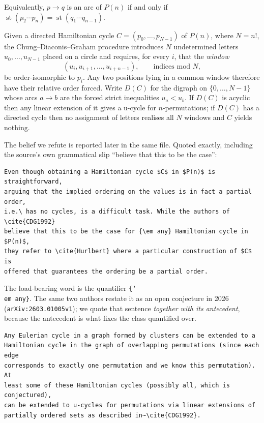 \documentclass[11pt]{amsart}
\DeclareMathOperator{\stt}{st}
\begin{document}
\noindent
Equivalently, $p\to q$ is an arc of $P(n)$ if and only if
$\stt(p_2\cdots p_n)=\stt(q_1\cdots q_{n-1})$.

Given a directed Hamiltonian cycle $C=(p_0,\dots,p_{N-1})$ of $P(n)$, where
$N=n!$, the Chung--Diaconis--Graham procedure \cite{CDG1992} introduces $N$
undetermined letters $u_0,\dots,u_{N-1}$ placed on a circle and requires, for
every $i$, that the \emph{window}
\[
 (u_i,u_{i+1},\dots,u_{i+n-1}),
 \qquad\text{indices mod }N,
\]
be order-isomorphic to $p_i$. Any two positions lying in a common window
therefore have their relative order forced. Write $D(C)$ for the digraph on
$\{0,\dots,N-1\}$ whose arcs $a\to b$ are the forced strict inequalities
$u_a<u_b$. If $D(C)$ is acyclic then any linear extension of it gives a u-cycle
for $n$-permutations; if $D(C)$ has a directed cycle then no assignment of
letters realises all $N$ windows and $C$ yields nothing.

The belief we refute is reported later in the same file. Quoted exactly,
including the source's own grammatical slip ``believe that this to be the
case'':

{\footnotesize\begin{verbatim}
Even though obtaining a Hamiltonian cycle $C$ in $P(n)$ is straightforward,
arguing that the implied ordering on the values is in fact a partial order,
i.e.\ has no cycles, is a difficult task. While the authors of \cite{CDG1992}
believe that this to be the case for {\em any} Hamiltonian cycle in $P(n)$,
they refer to \cite{Hurlbert} where a particular construction of $C$ is
offered that guarantees the ordering be a partial order.
\end{verbatim}}

\noindent
The load-bearing word is the quantifier \texttt{\{\char`\\em any\}}. The same
two authors restate it as an open conjecture in 2026 \cite{KQ2026}
(\texttt{arXiv:2603.01005v1}); we quote that sentence \emph{together with its
antecedent}, because the antecedent is what fixes the class quantified over.

{\footnotesize\begin{verbatim}
Any Eulerian cycle in a graph formed by clusters can be extended to a
Hamiltonian cycle in the graph of overlapping permutations (since each edge
corresponds to exactly one permutation and we know this permutation). At
least some of these Hamiltonian cycles (possibly all, which is conjectured),
can be extended to u-cycles for permutations via linear extensions of
partially ordered sets as described in~\cite{CDG1992}.
\end{verbatim}}
\end{document}
